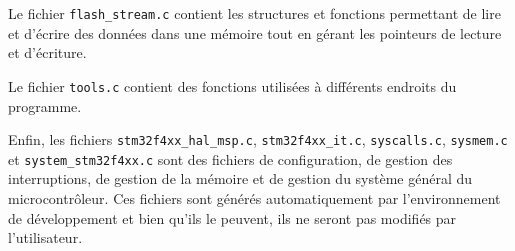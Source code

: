 \begin{minipage}{0.95\textwidth}
    
    \vspace{0.2cm}
    Le fichier \texttt{flash\_stream.c} contient les structures et fonctions
    permettant de lire et d'écrire des données dans une mémoire tout en gérant
    les pointeurs de lecture et d'écriture.

    
    \vspace{0.2cm}
    Le fichier \texttt{tools.c} contient des fonctions utilisées à différents
    endroits du programme.

    \vspace{0.5cm}

    Enfin, les fichiers \texttt{stm32f4xx\_hal\_msp.c},
    \texttt{stm32f4xx\_it.c}, \texttt{syscalls.c}, \texttt{sysmem.c} et
    \texttt{system\_stm32f4xx.c} sont des fichiers de configuration,
    de gestion des interruptions, de gestion de la mémoire et de gestion
    du système général du microcontrôleur. Ces fichiers sont générés
    automatiquement par l'environnement de développement et bien qu'ils le
    peuvent, ils ne seront pas modifiés par l'utilisateur.
    
\end{minipage}